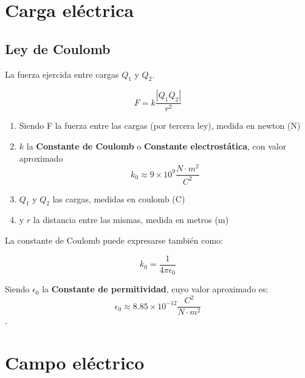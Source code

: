 \section{Carga eléctrica}

\subsection{Ley de Coulomb}

La fuerza ejercida entre cargas \(Q_1\) y \(Q_2\).

\vspace{1cm}
\begin{equation}
    F = k\frac{|Q_1Q_2|}{r^{2}}
\end{equation}
\vspace{1cm}

\begin{enumerate}
    \item Siendo F la fuerza entre las cargas (por tercera ley), medida en newton (N)
    \item \(k\) la \textbf{Constante de Coulomb} o \textbf{Constante electrostática},
    con valor aproximado 
    \begin{equation*}
        k_0\approx9\times10^{9} \frac{N\cdot m^{2}}{C^{2}}
    \end{equation*}
    \item \(Q_{1}\) y \(Q_{2}\) las cargas, medidas en coulomb (C)
    \item y \(r\) la distancia entre las mismas, medida en metros (m)
\end{enumerate}

La constante de Coulomb puede expresarse también como:

\vspace{1cm}
\begin{equation*}
    k_0 = \frac{1}{4\pi\epsilon_0}
\end{equation*}
\vspace{1cm}

Siendo \(\epsilon_0\) la \textbf{Constante de permitividad},
cuyo valor aproximado es: 
\begin{equation*}
    \epsilon_0 \approx 8.85 \times 10^{-12} \frac{C^{2}}{N\cdot m^{2}}
\end{equation*}.

\section{Campo eléctrico}

